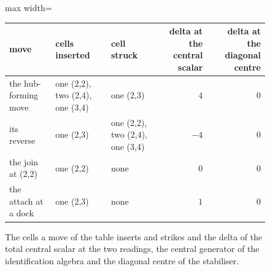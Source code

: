 \begin{figure}[h]\centering
\begin{adjustbox}{max width=\linewidth}\begin{tabular}{lllrr}\toprule
move & cells inserted & cell struck & delta at the central scalar & delta at the diagonal centre \\ \midrule
the hub-forming move & one (2,2), two (2,4), one (3,4) & one (2,3) & $4$ & $0$ \\
its reverse & one (2,3) & one (2,2), two (2,4), one (3,4) & $-4$ & $0$ \\
the join at (2,2) & one (2,2) & none & $0$ & $0$ \\
the attach at a dock & one (2,3) & none & $1$ & $0$ \\ \bottomrule
\end{tabular}\end{adjustbox}
\caption{The cells a move of the table inserts and strikes and the delta of the total central scalar at the two readings, the central generator of the identification algebra and the diagonal centre of the stabiliser.}
\end{figure}
